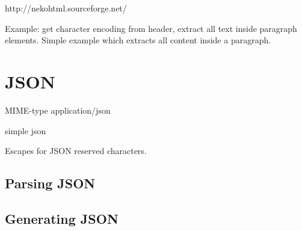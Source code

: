 http://nekohtml.sourceforge.net/

Example:  get character encoding from header, extract all text inside paragraph elements.
Simple example which extracts all content inside a paragraph.

\section{JSON}

MIME-type application/json

simple json

Escapes for JSON reserved characters.

\subsection{Parsing JSON}

\subsection{Generating JSON}


